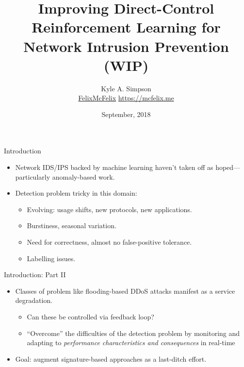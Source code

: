 \documentclass[aspectratio=169,xcolor={dvipsnames}
,hide notes
]{beamer}
\title{Improving Direct-Control Reinforcement Learning for Network Intrusion Prevention (WIP)}
\author{Kyle A. Simpson\\
	\small{\faGithub{} \href{https://github.com/felixmcfelix}{FelixMcFelix} \hspace{0.5em} \faGlobe{} \url{https://mcfelix.me}}}
\institute{University of Glasgow}
\date{\nth{3} September, 2018}
\begin{document}
\maketitle

\begin{frame}{Introduction}
	\begin{itemize}
		\item Network IDS/IPS backed by machine learning haven't taken off as hoped---particularly anomaly-based work.
		\item Detection problem tricky in this domain:
		\begin{itemize}
			\item Evolving: usage shifts, new protocols, new applications.
			\item Burstiness, seasonal variation.
			\item Need for correctness, almost no false-positive tolerance.
			\item Labelling issues.
		\end{itemize}
	\end{itemize}
\end{frame}

\begin{frame}{Introduction: Part II}
\begin{itemize}
	\item Classes of problem like flooding-based DDoS attacks manifest as a service degradation.
	\begin{itemize}
		\item Can these be controlled via feedback loop?
		\item \alert{``Overcome'' the difficulties of the detection problem} by monitoring and adapting to \emph{performance characteristics and consequences} in real-time
	\end{itemize}
	\item Goal: augment signature-based approaches as a last-ditch effort.
\end{itemize}
\end{frame}

\end{document}
